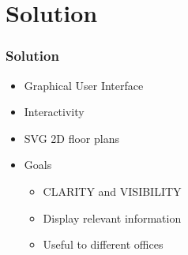 \documentclass[hyperref={pdfpagelabels=false}]{beamer}
\begin{document}
\section{Solution} 
\hypertarget{Solution}{{}}
\begin{frame}
\frametitle{Solution}
\begin{itemize}[<+->]
	\item Graphical User Interface
	\item Interactivity
	\item SVG 2D floor plans 
	\item {\Large Goals}
	\begin{itemize}
		\item CLARITY and VISIBILITY
		\item Display relevant information
		\item Useful to different offices 
	\end{itemize}
\end{itemize}
\end{frame}
\end{document}
